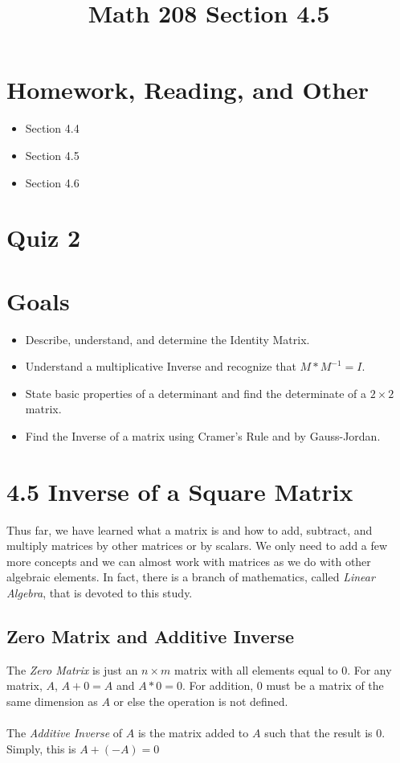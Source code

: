 \documentclass[14pt]{extarticle}
\title{\vspace{-5ex}Math 208 Section 4.5}
\date{\vspace{-10ex}}
\begin{document}
\maketitle		
\section*{Homework, Reading, and Other}
\begin{itemize}
	\item Section 4.4
	\item Section 4.5
	\item Section 4.6
\end{itemize}

\section*{Quiz 2}

\section*{Goals}
\begin{itemize}
	\item Describe, understand, and determine the Identity Matrix.
	\item Understand a multiplicative Inverse and recognize that $M*M^{-1} = I$.
	\item State basic properties of a determinant and find the determinate of a $2 \times 2$ matrix.
	\item Find the Inverse of a matrix using Cramer's Rule and by Gauss-Jordan.
\end{itemize}

\section*{4.5 Inverse of a Square Matrix}
Thus far, we have learned what a matrix is and how to add, subtract, and multiply matrices by other matrices or by scalars. We only need to add a few more concepts and we can almost work with matrices as we do with other algebraic elements. In fact, there is a branch of mathematics, called \textit{Linear Algebra}, that is devoted to this study.

\subsection{Zero Matrix and Additive Inverse}
The \textit{Zero Matrix} is just an $n\times m$ matrix with all elements equal to 0. For any matrix, $A$, $A+0=A$ and $A*0 =0$. For addition, $0$ must be a matrix of the same dimension as $A$ or else the operation is not defined.
\\\\
The \textit{Additive Inverse} of $A$ is the matrix added to $A$ such that the result is $0$. Simply, this is $A+ (-A) = 0$
\end{document}
